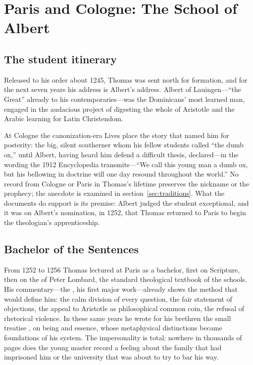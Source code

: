 \section{Paris and Cologne: The School of Albert}

\subsection{The student itinerary}

Released to his order about 1245, Thomas was sent north for formation, and
for the next seven years his address is Albert's address. Albert of
Lauingen---``the Great'' already to his contemporaries---was the
Dominicans' most learned man, engaged in the audacious project of
digesting the whole of Aristotle and the Arabic learning for Latin
Christendom.


At Cologne the canonization-era Lives place the story that named him for
posterity: the big, silent southerner whom his fellow students called
``the dumb ox,'' until Albert, having heard him defend a difficult
thesis, declared---in the wording the 1912 Encyclopedia transmits---``We
call this young man a dumb ox, but his bellowing in doctrine will one day
resound throughout the world.'' No record from Cologne or Paris in
Thomas's lifetime preserves the nickname or the prophecy; the anecdote is
examined in section~\ref{sec:traditions}. What the documents do support
is its premise: Albert judged the student exceptional, and it was on
Albert's nomination, in 1252, that Thomas returned to Paris to begin the
theologian's apprenticeship.

\subsection{Bachelor of the Sentences}

From 1252 to 1256 Thomas lectured at Paris as a bachelor, first on
Scripture, then on the  of Peter Lombard, the standard
theological textbook of the schools. His commentary---the
, his first major work---already shows
the method that would define him: the calm division of every question,
the fair statement of objections, the appeal to Aristotle as
philosophical common coin, the refusal of rhetorical violence. In these
same years he wrote for his brethren the small treatise , on being and essence, whose metaphysical distinctions became
foundations of his system. The impersonality is total: nowhere in
thousands of pages does the young master record a feeling about the
family that had imprisoned him or the university that was about to try
to bar his way.
